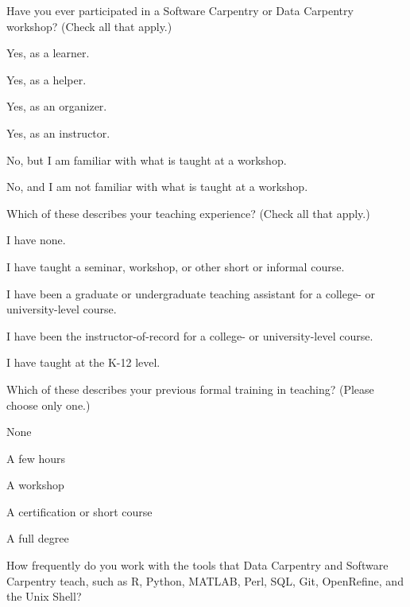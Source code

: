 \begin{genumerate}

\item
  Have you ever participated in a Software Carpentry or Data Carpentry
  workshop? (Check all that apply.)

  \begin{todolist}
  \item
    Yes, as a learner.
  \item
    Yes, as a helper.
  \item
    Yes, as an organizer.
  \item
    Yes, as an instructor.
  \item
    No, but I am familiar with what is taught at a workshop.
  \item
    No, and I am not familiar with what is taught at a workshop.
  \end{todolist}

\item
  Which of these describes your teaching experience?  (Check all that
  apply.)

  \begin{todolist}
  \item
    I have none.
  \item
    I have taught a seminar, workshop, or other short or informal course.
  \item
    I have been a graduate or undergraduate teaching assistant for a
    college- or university-level course.
  \item
    I have been the instructor-of-record for a college- or
    university-level course.
  \item
    I have taught at the K-12 level.
  \end{todolist}

\item
  Which of these describes your previous formal training in teaching?
  (Please choose only one.)

  \begin{todolist}
  \item
    None
  \item
    A few hours
  \item
    A workshop
  \item
    A certification or short course
  \item
    A full degree
  \end{todolist}

\item
  How frequently do you work with the tools that Data Carpentry and
  Software Carpentry teach, such as R, Python, MATLAB, Perl, SQL, Git,
  OpenRefine, and the Unix Shell?


\end{genumerate}
